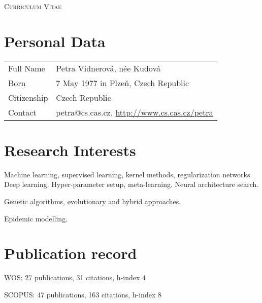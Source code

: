 \documentclass[a4paper, oneside, final]{scrartcl} %
\begin{document}


\noindent
{\fontsize{18}{18}\selectfont\scshape Curriculum Vitae} 



\section{Personal Data}
\begin{tabularx}{0.97\linewidth}{>{\raggedright}p{2cm}X}
Full Name & 	Petra Vidnerov\'a, n\'ee Kudov\'a\\
Born & 7 May 1977 in Plze\v{n}, Czech Republic\\
Citizenship 	& Czech Republic\\
Contact & petra@cs.cas.cz, \href{http://www.cs.cas.cz/petra}{http://www.cs.cas.cz/petra}
\end{tabularx}



\section{Research Interests}

Machine learning, supervised learning, kernel methods, regularization networks.
Deep learning. Hyper-parameter setup, meta-learning. Neural architecture search.

\noindent
Genetic algorithms, evolutionary and hybrid approaches.

\noindent
Epidemic modelling.


\section{Publication record}
WOS: 27 publications, 31 citations, h-index 4

\noindent 
SCOPUS: 47 publications, 163 citations, h-index 8


\end{document}
